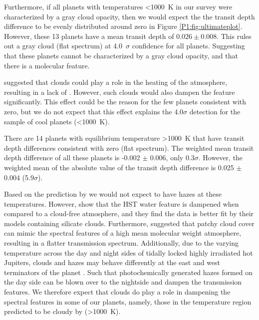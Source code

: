 Furthermore, if all planets with temperatures <1000~K in our survey were characterized by a gray cloud opacity, then we would expect the the transit depth difference to be evenly distributed around zero in Figure \ref{P1:fig:ultimateplot}. However, these 13 planets have a mean transit depth of $0.026 \pm 0.008$. This rules out a gray cloud (flat spectrum) at 4.0~$\sigma$ confidence for all planets. Suggesting that these planets cannot be characterized by a gray cloud opacity, and that there is a molecular feature.

\citet{Molaverdikhani2020} suggested that clouds could play a role in the heating of the atmosphere, resulting in a lack of . However, such clouds would also dampen the  feature significantly. This effect could be the reason for the few planets consistent with zero, but we do not expect that this effect explains the 4.0$\sigma$ detection for the sample of cool planets (<1000~K).

There are 14 planets with equilibrium temperature >1000~K that have transit depth differences consistent with zero (flat spectrum). The weighted mean transit depth difference of all these planets is -0.002 $\pm$ 0.006, only 0.3$\sigma$. However, the weighted mean of the absolute value of the transit depth difference is 0.025 $\pm$ 0.004 (5.9$\sigma$).

Based on the prediction by \citet{Morley2015} we would not expect to have hazes at these temperatures. However, \citet{Gao2020} show that the HST water feature is dampened when compared to a cloud-free atmosphere, and they find the data is better fit by their models containing silicate clouds. Furthermore, \citep{Line2016} suggested that patchy cloud cover can mimic the spectral features of a high mean molecular weight atmosphere, resulting in a flatter transmission spectrum. Additionally, due to the varying temperature across the day and night sides of tidally locked highly irradiated hot Jupiters, clouds and hazes may behave differently at the east and west terminators of the planet \citep{Kempton2017b}. Such that photochemically generated hazes formed on the day side can be blown over to the nightside and dampen the transmission features. We therefore expect that clouds do play a role in dampening the spectral features in some of our planets, namely, those in the temperature region predicted to be cloudy by \citet{Gao2020} (>1000~K).

